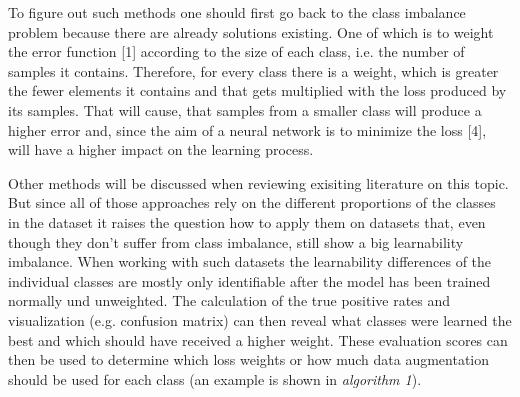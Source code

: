 \documentclass[journal]{IEEEtran}
\begin{document}

To figure out such methods one should first go back to the class imbalance problem because there are already solutions existing.
One of which is to weight the error function [1] according to the size of each class, i.e. the number of samples it contains.
Therefore, for every class there is a weight, which is greater the fewer elements it contains and that gets multiplied with the loss produced by its samples. %
That will cause, that samples from a smaller class will produce a higher error and, since the aim of a neural network is to minimize the loss [4], will have a higher impact on the learning process.

Other methods will be discussed when reviewing exisiting literature on this topic. 
But since all of those approaches rely on the different proportions of the classes in the dataset it raises the question how to apply them on datasets that, even though they don't suffer from class imbalance, still show a big learnability imbalance.
When working with such datasets the learnability differences of the individual classes are mostly only identifiable after the model has been trained normally und unweighted. %
The calculation of the true positive rates and visualization (e.g. confusion matrix) can then reveal what classes were learned the best and which should have received a higher weight.
These evaluation scores can then be used to determine which loss weights or how much data augmentation should be used for each class (an example is shown in \emph{algorithm 1}).
\end{document}
